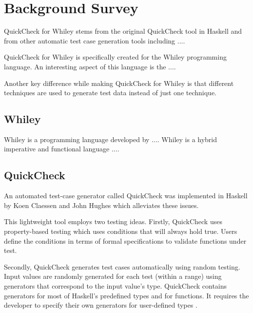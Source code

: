 \chapter{Background Survey}\label{chapter:background}


QuickCheck for Whiley stems from the original QuickCheck tool in Haskell and from other automatic test case generation tools including .... 

QuickCheck for Whiley is specifically created for the Whiley programming language. An interesting aspect of this language is the ....


Another key difference while making QuickCheck for Whiley is that different techniques are used to generate test data instead of just one technique.

\section{Whiley}
Whiley is a programming language developed by .... 
Whiley is a hybrid imperative and functional language ....


\section{QuickCheck}

An automated test-case generator called QuickCheck was implemented in Haskell by Koen Claessen and John Hughes \cite{QClightweight} which alleviates these issues.

This lightweight tool employs two testing ideas.
Firstly, QuickCheck uses property-based testing which uses conditions that will always hold true. Users define the conditions in terms of formal specifications to validate functions under test.

Secondly, QuickCheck generates test cases automatically using random testing. Input values are randomly generated for each test (within a range) using generators that correspond to the input value's type. QuickCheck contains generators for most of Haskell's predefined types and for functions. It requires the developer to specify their own generators for user-defined types \cite{QClightweight}. 

